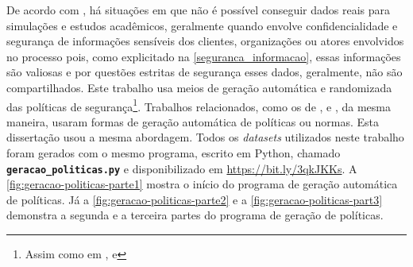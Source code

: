 De acordo com , há situações em que não é possível conseguir dados reais para simulações e estudos acadêmicos, geralmente quando envolve confidencialidade e segurança de informações sensíveis dos clientes, organizações ou atores envolvidos no processo pois, como explicitado na \autoref{seguranca_informacao}, essas informações são valiosas e por questões estritas de segurança esses dados, geralmente, não são compartilhados. Este trabalho usa meios de geração automática e randomizada das políticas de segurança\footnote{Assim como em ,  e }.
Trabalhos relacionados, como os de ,  e , da mesma maneira, usaram formas de geração automática de políticas ou normas. Esta dissertação usou a mesma abordagem. Todos os \textit{datasets} utilizados neste trabalho foram gerados com o mesmo programa, escrito em Python, chamado \texttt{\textbf{geracao\_politicas.py}}  e disponibilizado em \url{https://bit.ly/3qkJKKs}. A \autoref{fig:geracao-politicas-parte1} mostra o início do programa de geração automática de políticas. Já a \autoref{fig:geracao-politicas-parte2} e a \autoref{fig:geracao-politicas-part3} demonstra a segunda e a terceira partes do programa de geração de políticas.
